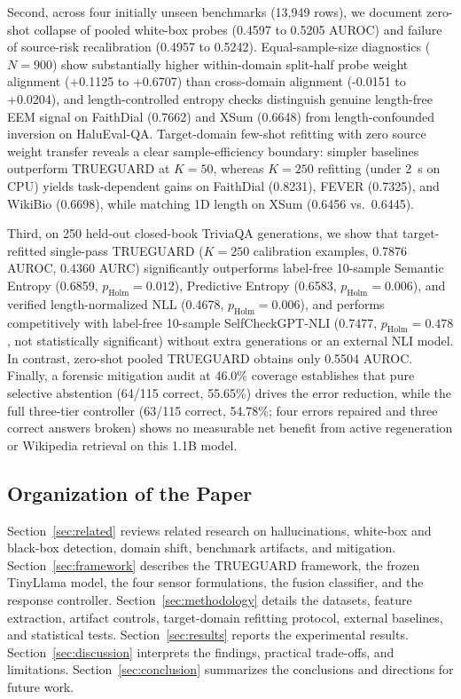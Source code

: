 \documentclass{ieeeaccess}
\begin{document}
Second, across four initially unseen benchmarks (13,949 rows), we document zero-shot collapse of pooled white-box probes (0.4597 to 0.5205 AUROC) and failure of source-risk recalibration (0.4957 to 0.5242). Equal-sample-size diagnostics ($N = 900$) show substantially higher within-domain split-half probe weight alignment (+0.1125 to +0.6707) than cross-domain alignment (-0.0151 to +0.0204), and length-controlled entropy checks distinguish genuine length-free EEM signal on FaithDial (0.7662) and XSum (0.6648) from length-confounded inversion on HaluEval-QA. Target-domain few-shot refitting with zero source weight transfer reveals a clear sample-efficiency boundary: simpler baselines outperform TRUEGUARD at $K = 50$, whereas $K = 250$ refitting (under 2~s on CPU) yields task-dependent gains on FaithDial (0.8231), FEVER (0.7325), and WikiBio (0.6698), while matching 1D length on XSum (0.6456 vs.\ 0.6445).

Third, on 250 held-out closed-book TriviaQA generations, we show that target-refitted single-pass TRUEGUARD ($K = 250$ calibration examples, 0.7876 AUROC, 0.4360 AURC) significantly outperforms label-free 10-sample Semantic Entropy (0.6859, $p_{\text{Holm}} = 0.012$), Predictive Entropy (0.6583, $p_{\text{Holm}} = 0.006$), and verified length-normalized NLL (0.4678, $p_{\text{Holm}} = 0.006$), and performs competitively with label-free 10-sample SelfCheckGPT-NLI (0.7477, $p_{\text{Holm}} = 0.478$, not statistically significant) without extra generations or an external NLI model. In contrast, zero-shot pooled TRUEGUARD obtains only 0.5504 AUROC. Finally, a forensic mitigation audit at 46.0\% coverage establishes that pure selective abstention (64/115 correct, 55.65\%) drives the error reduction, while the full three-tier controller (63/115 correct, 54.78\%; four errors repaired and three correct answers broken) shows no measurable net benefit from active regeneration or Wikipedia retrieval on this 1.1B model.

\subsection{Organization of the Paper}
Section~\ref{sec:related} reviews related research on hallucinations, white-box and black-box detection, domain shift, benchmark artifacts, and mitigation. Section~\ref{sec:framework} describes the TRUEGUARD framework, the frozen TinyLlama model, the four sensor formulations, the fusion classifier, and the response controller. Section~\ref{sec:methodology} details the datasets, feature extraction, artifact controls, target-domain refitting protocol, external baselines, and statistical tests. Section~\ref{sec:results} reports the experimental results. Section~\ref{sec:discussion} interprets the findings, practical trade-offs, and limitations. Section~\ref{sec:conclusion} summarizes the conclusions and directions for future work.
\end{document}
